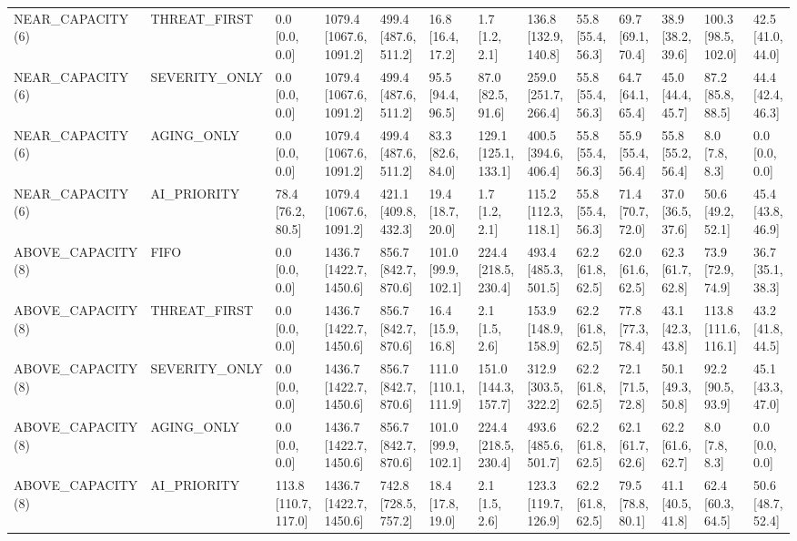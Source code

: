 \begin{table}
\begin{tabular}{lllllllllllll}
NEAR\_CAPACITY (6) & THREAT\_FIRST & 0.0 [0.0, 0.0] & 1079.4 [1067.6, 1091.2] & 499.4 [487.6, 511.2] & 16.8 [16.4, 17.2] & 1.7 [1.2, 2.1] & 136.8 [132.9, 140.8] & 55.8 [55.4, 56.3] & 69.7 [69.1, 70.4] & 38.9 [38.2, 39.6] & 100.3 [98.5, 102.0] & 42.5 [41.0, 44.0] \\
NEAR\_CAPACITY (6) & SEVERITY\_ONLY & 0.0 [0.0, 0.0] & 1079.4 [1067.6, 1091.2] & 499.4 [487.6, 511.2] & 95.5 [94.4, 96.5] & 87.0 [82.5, 91.6] & 259.0 [251.7, 266.4] & 55.8 [55.4, 56.3] & 64.7 [64.1, 65.4] & 45.0 [44.4, 45.7] & 87.2 [85.8, 88.5] & 44.4 [42.4, 46.3] \\
NEAR\_CAPACITY (6) & AGING\_ONLY & 0.0 [0.0, 0.0] & 1079.4 [1067.6, 1091.2] & 499.4 [487.6, 511.2] & 83.3 [82.6, 84.0] & 129.1 [125.1, 133.1] & 400.5 [394.6, 406.4] & 55.8 [55.4, 56.3] & 55.9 [55.4, 56.4] & 55.8 [55.2, 56.4] & 8.0 [7.8, 8.3] & 0.0 [0.0, 0.0] \\
NEAR\_CAPACITY (6) & AI\_PRIORITY & 78.4 [76.2, 80.5] & 1079.4 [1067.6, 1091.2] & 421.1 [409.8, 432.3] & 19.4 [18.7, 20.0] & 1.7 [1.2, 2.1] & 115.2 [112.3, 118.1] & 55.8 [55.4, 56.3] & 71.4 [70.7, 72.0] & 37.0 [36.5, 37.6] & 50.6 [49.2, 52.1] & 45.4 [43.8, 46.9] \\
ABOVE\_CAPACITY (8) & FIFO & 0.0 [0.0, 0.0] & 1436.7 [1422.7, 1450.6] & 856.7 [842.7, 870.6] & 101.0 [99.9, 102.1] & 224.4 [218.5, 230.4] & 493.4 [485.3, 501.5] & 62.2 [61.8, 62.5] & 62.0 [61.6, 62.5] & 62.3 [61.7, 62.8] & 73.9 [72.9, 74.9] & 36.7 [35.1, 38.3] \\
ABOVE\_CAPACITY (8) & THREAT\_FIRST & 0.0 [0.0, 0.0] & 1436.7 [1422.7, 1450.6] & 856.7 [842.7, 870.6] & 16.4 [15.9, 16.8] & 2.1 [1.5, 2.6] & 153.9 [148.9, 158.9] & 62.2 [61.8, 62.5] & 77.8 [77.3, 78.4] & 43.1 [42.3, 43.8] & 113.8 [111.6, 116.1] & 43.2 [41.8, 44.5] \\
ABOVE\_CAPACITY (8) & SEVERITY\_ONLY & 0.0 [0.0, 0.0] & 1436.7 [1422.7, 1450.6] & 856.7 [842.7, 870.6] & 111.0 [110.1, 111.9] & 151.0 [144.3, 157.7] & 312.9 [303.5, 322.2] & 62.2 [61.8, 62.5] & 72.1 [71.5, 72.8] & 50.1 [49.3, 50.8] & 92.2 [90.5, 93.9] & 45.1 [43.3, 47.0] \\
ABOVE\_CAPACITY (8) & AGING\_ONLY & 0.0 [0.0, 0.0] & 1436.7 [1422.7, 1450.6] & 856.7 [842.7, 870.6] & 101.0 [99.9, 102.1] & 224.4 [218.5, 230.4] & 493.6 [485.6, 501.7] & 62.2 [61.8, 62.5] & 62.1 [61.7, 62.6] & 62.2 [61.6, 62.7] & 8.0 [7.8, 8.3] & 0.0 [0.0, 0.0] \\
ABOVE\_CAPACITY (8) & AI\_PRIORITY & 113.8 [110.7, 117.0] & 1436.7 [1422.7, 1450.6] & 742.8 [728.5, 757.2] & 18.4 [17.8, 19.0] & 2.1 [1.5, 2.6] & 123.3 [119.7, 126.9] & 62.2 [61.8, 62.5] & 79.5 [78.8, 80.1] & 41.1 [40.5, 41.8] & 62.4 [60.3, 64.5] & 50.6 [48.7, 52.4] \\
\bottomrule
\end{tabular}
\end{table}
